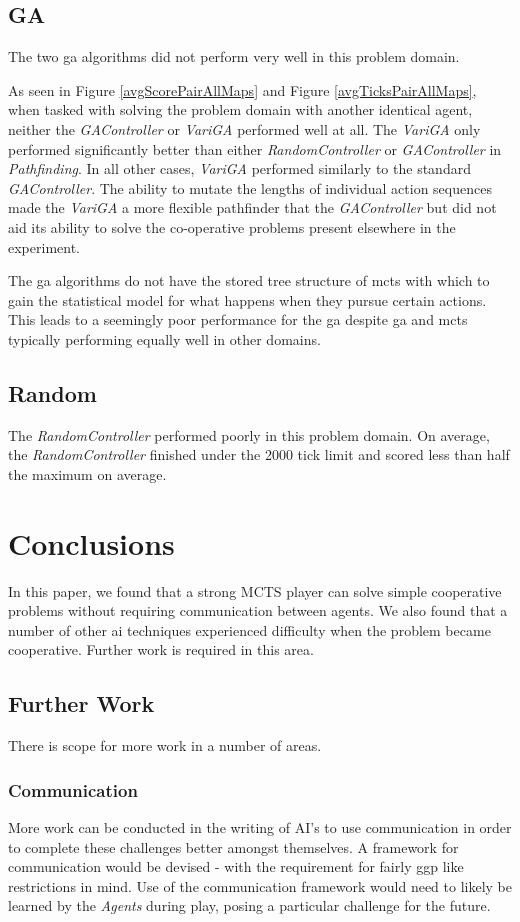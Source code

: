 \documentclass{IEEEtran}
\begin{document}
\subsection{GA}
The two \gls{ga} algorithms did not perform very well in this problem domain. 

As seen in Figure \ref{avgScorePairAllMaps} and Figure \ref{avgTicksPairAllMaps}, when tasked with solving the problem domain with another identical agent, neither the \emph{GAController} or \emph{VariGA} performed well at all. The \emph{VariGA} only performed significantly better than either \emph{RandomController} or \emph{GAController} in \emph{Pathfinding}. In all other cases, \emph{VariGA} performed similarly to the standard \emph{GAController}. The ability to mutate the lengths of individual action sequences made the \emph{VariGA} a more flexible pathfinder that the \emph{GAController} but did not aid its ability to solve the co-operative problems present elsewhere in the experiment.

The \gls{ga} algorithms do not have the stored tree structure of \gls{mcts} with which to gain the statistical model for what happens when they pursue certain actions. This leads to a seemingly poor performance for the \gls{ga} despite \gls{ga} and \gls{mcts} typically performing equally well in other domains.
\subsection{Random}
The \emph{RandomController} performed poorly in this problem domain. On average, the \emph{RandomController} finished under the 2000 tick limit and scored less than half the maximum on average.
\section{Conclusions}
In this paper, we found that a strong MCTS player can solve simple cooperative problems without requiring communication between agents. We also found that a number of other \gls{ai} techniques experienced difficulty when the problem became cooperative. Further work is required in this area.

\subsection{Further Work}
There is scope for more work in a number of areas.

\subsubsection{Communication}
More work can be conducted in the writing of AI's to use communication in order to complete these challenges better amongst themselves. A framework for communication would be devised - with the requirement for fairly \gls{ggp} like restrictions in mind. Use of the communication framework would need to likely be learned by the \emph{Agents} during play, posing a particular challenge for the future.
\end{document}
